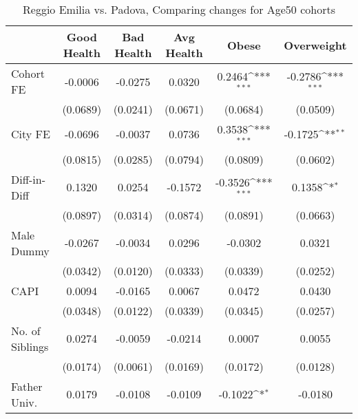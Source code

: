 \begin{table}[htbp]\centering
\def\sym#1{\ifmmode^{#1}\else\(^{#1}\)\fi}
\caption{Reggio Emilia vs. Padova, Comparing changes for Age50 cohorts}
\begin{tabular}{l*{5}{c}}
\toprule
            &\multicolumn{1}{c}{Good Health}&\multicolumn{1}{c}{Bad Health}&\multicolumn{1}{c}{Avg Health}&\multicolumn{1}{c}{Obese}&\multicolumn{1}{c}{Overweight}\\
\midrule
Cohort FE   &     -0.0006         &     -0.0275         &      0.0320         &      0.2464\sym{***}&     -0.2786\sym{***}\\
            &    (0.0689)         &    (0.0241)         &    (0.0671)         &    (0.0684)         &    (0.0509)         \\
\addlinespace
City FE     &     -0.0696         &     -0.0037         &      0.0736         &      0.3538\sym{***}&     -0.1725\sym{**} \\
            &    (0.0815)         &    (0.0285)         &    (0.0794)         &    (0.0809)         &    (0.0602)         \\
\addlinespace
Diff-in-Diff&      0.1320         &      0.0254         &     -0.1572         &     -0.3526\sym{***}&      0.1358\sym{*}  \\
            &    (0.0897)         &    (0.0314)         &    (0.0874)         &    (0.0891)         &    (0.0663)         \\
\addlinespace
Male Dummy  &     -0.0267         &     -0.0034         &      0.0296         &     -0.0302         &      0.0321         \\
            &    (0.0342)         &    (0.0120)         &    (0.0333)         &    (0.0339)         &    (0.0252)         \\
\addlinespace
CAPI        &      0.0094         &     -0.0165         &      0.0067         &      0.0472         &      0.0430         \\
            &    (0.0348)         &    (0.0122)         &    (0.0339)         &    (0.0345)         &    (0.0257)         \\
\addlinespace
No. of Siblings&      0.0274         &     -0.0059         &     -0.0214         &      0.0007         &      0.0055         \\
            &    (0.0174)         &    (0.0061)         &    (0.0169)         &    (0.0172)         &    (0.0128)         \\
\addlinespace
Father Univ.&      0.0179         &     -0.0108         &     -0.0109         &     -0.1022\sym{*}  &     -0.0180         \\

\end{tabular}
\end{table}
